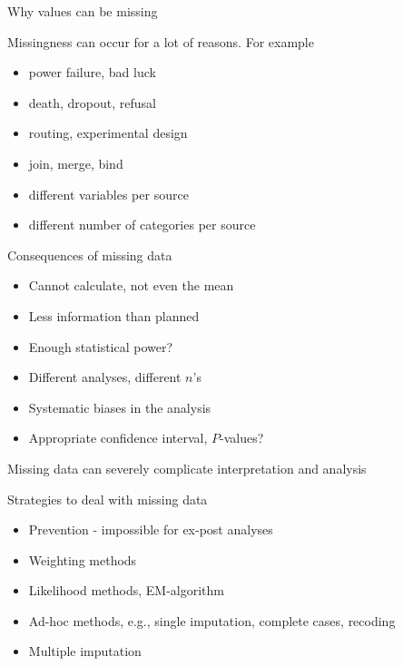 \documentclass[ignorenonframetext,aspectratio=43]{beamer}
\providecommand{\tightlist}{%
  \setlength{\itemsep}{0pt}\setlength{\parskip}{0pt}}
\begin{document}
\begin{frame}{Why values can be missing}
\protect\hypertarget{why-values-can-be-missing}{}

Missingness can occur for a lot of reasons. For example

\begin{itemize}
\tightlist
\item
  power failure, bad luck
\item
  death, dropout, refusal
\item
  routing, experimental design
\item
  join, merge, bind
\item
  different variables per source
\item
  different number of categories per source
\end{itemize}

\end{frame}

\begin{frame}{Consequences of missing data}
\protect\hypertarget{consequences-of-missing-data}{}

\begin{itemize}
\tightlist
\item
  Cannot calculate, not even the mean
\item
  Less information than planned
\item
  Enough statistical power?
\item
  Different analyses, different \(n\)'s
\item
  Systematic biases in the analysis
\item
  Appropriate confidence interval, \(P\)-values?
\end{itemize}

Missing data can severely complicate interpretation and analysis

\end{frame}

\begin{frame}{Strategies to deal with missing data}
\protect\hypertarget{strategies-to-deal-with-missing-data}{}

\begin{itemize}
\tightlist
\item
  Prevention - impossible for ex-post analyses
\item
  Weighting methods
\item
  Likelihood methods, EM-algorithm
\item
  Ad-hoc methods, e.g., single imputation, complete cases, recoding
\item
  Multiple imputation
\end{itemize}

\end{frame}
\end{document}
